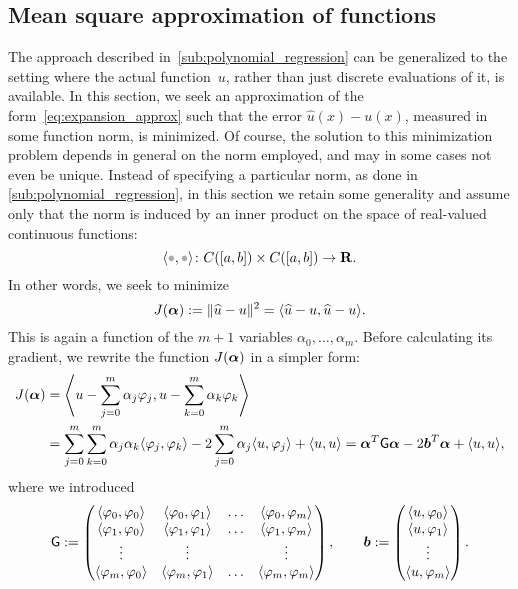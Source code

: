 \subsection{Mean square approximation of functions}
\label{sub:mean_square_approximation}
The approach described in~\cref{sub:polynomial_regression} can be generalized to the setting where the actual function~$u$,
rather than just discrete evaluations of it, is available.
In this section, we seek an approximation of the form~\eqref{eq:expansion_approx}
such that the error $\widehat u(x) - u(x)$, measured in some function norm,
is minimized.
Of course, the solution to this minimization problem depends in general on the norm employed,
and may in some cases not even be unique.
Instead of specifying a particular norm,
as done in \cref{sub:polynomial_regression},
in this section we retain some generality and assume only that the norm is induced by an inner product on the space of real-valued continuous functions:
\begin{equation}
    \label{eq:inner_product_approx}
    \ip{\placeholder,\placeholder} \colon C([a,b]) \times C([a, b]) \to \real.
\end{equation}
In other words,
we seek to minimize
\[
    J(\vect \alpha) := \norm{\widehat u - u}^2 = \ip{\widehat u - u, \widehat u - u}.
\]
This is again a function of the $m+1$ variables $\alpha_0, \dotsc, \alpha_m$.
Before calculating its gradient,
we rewrite the function $J(\vect \alpha)$ in a simpler form:
\begin{align*}
    J(\vect \alpha)
    &= \ip*{u - \sum_{j=0}^{m} \alpha_j \varphi_j,u - \sum_{k=0}^{m} \alpha_k \varphi_k} \\
    &= \sum_{j=0}^{m} \sum_{k=0}^{m} \alpha_j \alpha_k \ip{\varphi_j,\varphi_k}- 2 \sum_{j=0}^{m} \alpha_j \ip{u,\varphi_j} + \ip{u,u}
    = \vect \alpha^\t \mat G \vect \alpha - 2 \vect b^\t \vect \alpha + \ip{u,u},
\end{align*}
where we introduced
\begin{equation}
    \label{eq:approx_matrix_m}
    \mat G :=
    \begin{pmatrix}
        \ip{\varphi_0, \varphi_0} & \ip{\varphi_0, \varphi_1} & \hdots & \ip{\varphi_0, \varphi_m} \\
        \ip{\varphi_1, \varphi_0} & \ip{\varphi_1, \varphi_1} & \hdots & \ip{\varphi_1, \varphi_m} \\
        \vdots & \vdots & & \vdots \\
        \ip{\varphi_m, \varphi_0} & \ip{\varphi_m, \varphi_1} & \hdots & \ip{\varphi_m, \varphi_m}
    \end{pmatrix},
    \qquad
    \vect b :=
    \begin{pmatrix}
        \ip{u, \varphi_0} \\
        \ip{u, \varphi_1} \\
        \vdots \\
        \ip{u, \varphi_m} \\
    \end{pmatrix}.
\end{equation}
